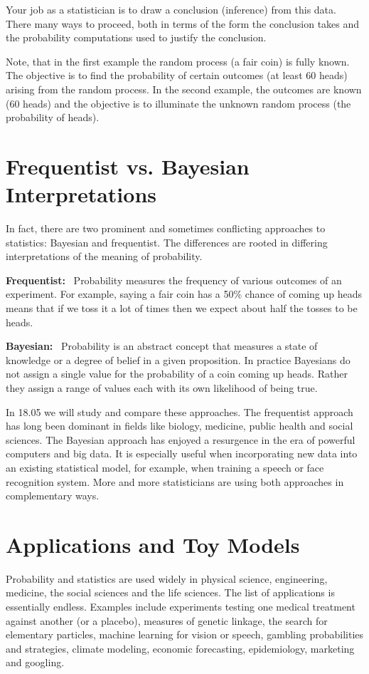 Your job as a statistician is to draw a conclusion (inference) from this data.
There many ways to proceed, both in terms of the form the conclusion takes
and the probability computations used to justify the conclusion. 

Note, that in the first example the random process (a fair coin) is fully known.
The objective is to find the probability of certain outcomes (at least 60 heads) arising from the random process. In the second example, the outcomes are known (60 heads) and the objective is to illuminate the unknown random process (the probability of heads). 

\section{Frequentist vs. Bayesian Interpretations}

In fact, there are two prominent and sometimes conflicting approaches 
to statistics: Bayesian and frequentist. The differences are rooted in
differing interpretations of the meaning of probability.

\textbf{Frequentist:} \, Probability measures the frequency of various 
outcomes of an experiment. For example, saying a fair coin has a
50\% chance of coming up heads means that if we toss it a lot of times
then we expect about half the tosses to be heads.

\textbf{Bayesian:} \, Probability is an abstract concept that measures
a state of knowledge or a degree of belief in a given proposition.
In practice Bayesians do not assign a single value for the probability of
a coin coming up heads. Rather they assign a range of values each
with its own likelihood of being true.

In 18.05 we will study and compare these approaches.
The frequentist approach has long been dominant
in fields like biology, medicine, public health and social sciences. The Bayesian approach has enjoyed a resurgence in the era of powerful computers and big data. It is especially useful when incorporating new data into an existing statistical model, for example, when training a speech or face recognition system. 
More and more statisticians are using both approaches in complementary ways.  


\section{Applications and Toy Models}

Probability and statistics are used widely in physical science, engineering, medicine, the social sciences and the life sciences. The list of applications is essentially endless. Examples
include experiments testing one medical treatment against another (or a placebo), measures of genetic linkage, the search for elementary particles,
machine learning for vision or speech, 
gambling probabilities and strategies, 
climate modeling, economic forecasting, epidemiology, marketing and googling.

